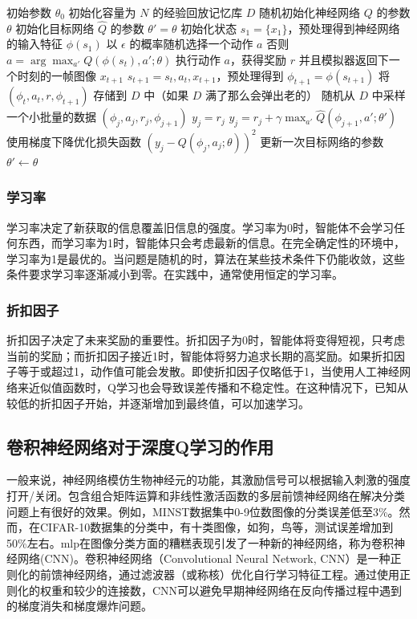 \documentclass{article}
\begin{document}
\begin{algorithm}[h!]
\caption{深度Q学习算法}
\label{alg:DQN算法}
\begin{algorithmic}[1]
\Require 初始参数 $\theta_0$
\State 初始化容量为 $N$ 的经验回放记忆库 $D$
\State 随机初始化神经网络 $Q$ 的参数 $\theta$
\State 初始化目标网络 $\hat{Q}$ 的参数 $\theta' = \theta$
    \State 初始化状态 $s_1 = \{x_1\}$，预处理得到神经网络的输入特征 $\phi(s_1)$
        \State 以 $\epsilon$ 的概率随机选择一个动作 $a$
        \State 否则 $a = \arg\max_{a'} Q(\phi(s_t), a'; \theta)$
        \State 执行动作 $a$，获得奖励 $r$ 并且模拟器返回下一个时刻的一帧图像 $x_{t+1}$
        \State $s_{t+1} = s_t, a_t, x_{t+1}$，预处理得到 $\phi_{t+1} = \phi(s_{t+1})$
        \State 将 $(\phi_t, a_t, r, \phi_{t+1})$ 存储到 $D$ 中（如果 $D$ 满了那么会弹出老的）
        \State 随机从 $D$ 中采样一个小批量的数据 $(\phi_j, a_j, r_j, \phi_{j+1})$
            \State $y_j = r_j$
        \Else
            \State $y_j = r_j + \gamma \max_{a'} \hat{Q}(\phi_{j+1}, a'; \theta')$
        \EndIf
        \State 使用梯度下降优化损失函数 $(y_j - Q(\phi_j, a_j; \theta))^2$
            \State 更新一次目标网络的参数 $\theta' \leftarrow \theta$
        \EndIf
    \EndFor
\EndFor
\end{algorithmic}
\end{algorithm}

\subsubsection{学习率}
学习率决定了新获取的信息覆盖旧信息的强度。学习率为0时，智能体不会学习任何东西，而学习率为1时，智能体只会考虑最新的信息。在完全确定性的环境中，学习率为1是最优的。当问题是随机的时，算法在某些技术条件下仍能收敛，这些条件要求学习率逐渐减小到零。在实践中，通常使用恒定的学习率。

\subsubsection{折扣因子}
折扣因子决定了未来奖励的重要性。折扣因子为0时，智能体将变得短视，只考虑当前的奖励；而折扣因子接近1时，智能体将努力追求长期的高奖励。如果折扣因子等于或超过1，动作值可能会发散。即使折扣因子仅略低于1，当使用人工神经网络来近似值函数时，Q学习也会导致误差传播和不稳定性。在这种情况下，已知从较低的折扣因子开始，并逐渐增加到最终值，可以加速学习。

\subsection{卷积神经网络对于深度Q学习的作用}
一般来说，神经网络模仿生物神经元的功能，其激励信号可以根据输入刺激的强度打开/关闭。包含组合矩阵运算和非线性激活函数的多层前馈神经网络在解决分类问题上有很好的效果。例如，MINST数据集中0-9位数图像的分类误差低至3\%。然而，在CIFAR-10数据集的分类中，有十类图像，如狗，鸟等，测试误差增加到50\%左右。mlp在图像分类方面的糟糕表现引发了一种新的神经网络，称为卷积神经网络(CNN)。卷积神经网络（Convolutional Neural Network, CNN）是一种正则化的前馈神经网络，通过滤波器（或称核）优化自行学习特征工程。通过使用正则化的权重和较少的连接数，CNN可以避免早期神经网络在反向传播过程中遇到的梯度消失和梯度爆炸问题。
\end{document}

